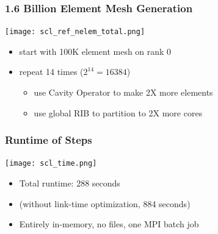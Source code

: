 \documentclass{beamer}
\begin{document}


\begin{frame}
\frametitle{1.6 Billion Element Mesh Generation}
\begin{center}
\texttt{[image: scl\_ref\_nelem\_total.png]}
\end{center}
\begin{itemize}
\item start with 100K element mesh on rank 0
\item repeat 14 times ($2^{14} = 16384$)
\begin{itemize}
\item use Cavity Operator to make 2X more elements
\item use global RIB to partition to 2X more cores
\end{itemize}
\end{itemize}
\end{frame}

\begin{frame}
\frametitle{Runtime of Steps}
\begin{center}
\texttt{[image: scl\_time.png]}
\end{center}
\begin{itemize}
\item Total runtime: 288 seconds
\item (without link-time optimization, 884 seconds)
\item Entirely in-memory, no files, one MPI batch job
\end{itemize}
\end{frame}
\end{document}
